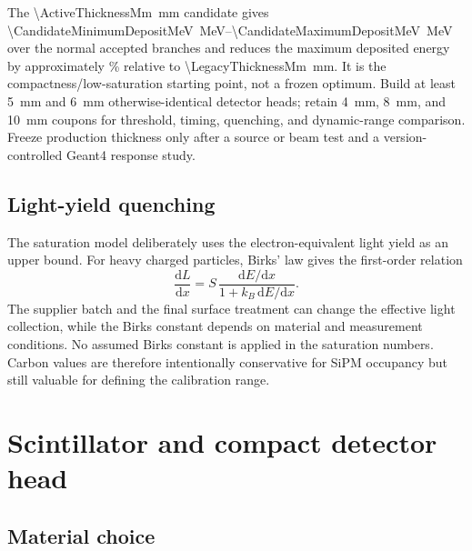\documentclass[10pt,letterpaper]{article}
\begin{document}
The \SI{\ActiveThicknessMm}{\milli\meter} candidate gives
\SIrange{\CandidateMinimumDepositMeV}{\CandidateMaximumDepositMeV}{\mega\electronvolt}
over the normal accepted branches and reduces the maximum deposited energy by approximately
\MaximumDepositReductionPercent\% relative to \SI{\LegacyThicknessMm}{\milli\meter}.
It is the compactness/low-saturation starting point, not a frozen optimum. Build at least
\SI{5}{\milli\meter} and \SI{6}{\milli\meter} otherwise-identical detector heads; retain
\SI{4}{\milli\meter}, \SI{8}{\milli\meter}, and \SI{10}{\milli\meter} coupons for threshold,
timing, quenching, and dynamic-range comparison. Freeze production thickness only after a
source or beam test and a version-controlled Geant4 response study.

\subsection{Light-yield quenching}

The saturation model deliberately uses the electron-equivalent light yield as an upper bound.
For heavy charged particles, Birks' law gives the first-order relation
\begin{equation}
  \frac{\mathrm{d}L}{\mathrm{d}x}
  =
  S\,\frac{\mathrm{d}E/\mathrm{d}x}
  {1 + k_B\,\mathrm{d}E/\mathrm{d}x}.
\end{equation}
The supplier batch and the final surface treatment can change the effective light collection,
while the Birks constant depends on material and measurement conditions. No assumed Birks
constant is applied in the saturation numbers. Carbon values are therefore intentionally
conservative for SiPM occupancy but still valuable for defining the calibration range.

\section{Scintillator and compact detector head}

\subsection{Material choice}
\end{document}
